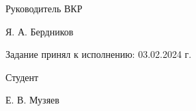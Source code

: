 \begin{spacing}{1}
\vfill

\begin{minipage}{0.366\textwidth}
   \flushleft
   Руководитель ВКР
\end{minipage}
\begin{minipage}{0.25\textwidth}
   \centering
   \underline{\hspace{2cm}}
\end{minipage}
\begin{minipage}{0.3\textwidth}
   \flushright
   Я. А. Бердников
\end{minipage}

\hfill \break

Задание принял к исполнению: 03.02.2024 г. \\

\begin{minipage}{0.366\textwidth}
   \flushleft
   Студент
\end{minipage}
\begin{minipage}{0.25\textwidth}
   \centering
   \underline{\hspace{2cm}} 
\end{minipage}
\begin{minipage}{0.3\textwidth}
   \flushright
   Е. В. Музяев
\end{minipage}
\end{spacing}
\newpage
